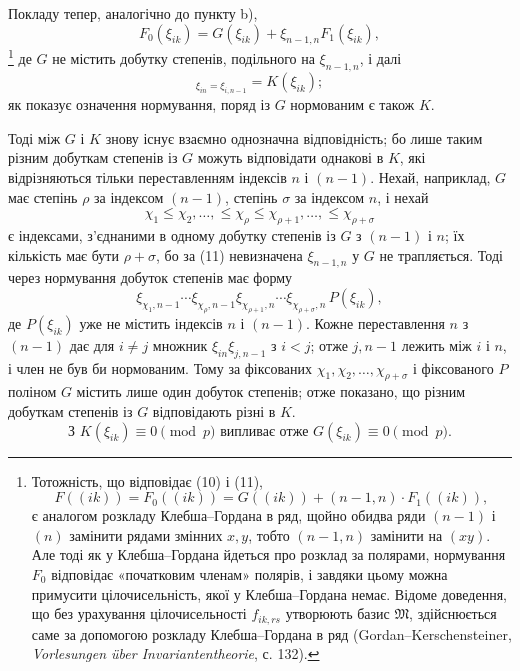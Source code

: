 \documentclass[11pt]{article}
\providecommand{\frM}{\mathfrak M}
\begin{document}
Покладу тепер, аналогічно до пункту b),
\begin{equation}
        F_0(\xi_{ik})=G(\xi_{ik})+\xi_{n-1,n}F_1(\xi_{ik}),
\end{equation}
\footnote{Тотожність, що відповідає (10) і (11),
        \[
          F((ik))=F_0((ik))=G((ik))+(n-1,n)\cdot F_1((ik)),
        \]
        є аналогом розкладу Клебша--Гордана в ряд, щойно обидва ряди \((n-1)\) і \((n)\) замінити рядами змінних \(x,y\), тобто \((n-1,n)\) замінити на \((xy)\). Але тоді як у Клебша--Гордана йдеться про розклад за полярами, нормування \(F_0\) відповідає «початковим членам» полярів, і завдяки цьому можна примусити цілочисельність, якої у Клебша--Гордана немає. Відоме доведення, що без урахування цілочисельності \(f_{ik,rs}\) утворюють базис \(\frM\), здійснюється саме за допомогою розкладу Клебша--Гордана в ряд (Gordan--Kerschensteiner, \emph{Vorlesungen über Invariantentheorie}, с. 132).}
де \(G\) не містить добутку степенів, подільного на \(\xi_{n-1,n}\), і далі
\begin{equation}
        [G]_{\xi_{in}=\xi_{i,n-1}}=K(\xi_{ik});
\end{equation}
як показує означення нормування, поряд із \(G\) нормованим є також \(K\).

Тоді між \(G\) і \(K\) знову існує взаємно однозначна відповідність; бо лише таким різним добуткам степенів із \(G\) можуть відповідати однакові в \(K\), які відрізняються тільки переставленням індексів \(n\) і \((n-1)\). Нехай, наприклад, \(G\) має степінь \(\rho\) за індексом \((n-1)\), степінь \(\sigma\) за індексом \(n\), і нехай
\[
        \chi_1\le\chi_2,\ldots,\le\chi_\rho\le\chi_{\rho+1},\ldots,\le\chi_{\rho+\sigma}
\]
є індексами, з'єднаними в одному добутку степенів із \(G\) з \((n-1)\) і \(n\); їх кількість має бути \(\rho+\sigma\), бо за (11) невизначена \(\xi_{n-1,n}\) у \(G\) не трапляється. Тоді через нормування добуток степенів має форму
\[
        \xi_{\chi_1,n-1}\cdots\xi_{\chi_\rho,n-1}
        \xi_{\chi_{\rho+1},n}\cdots\xi_{\chi_{\rho+\sigma},n}\,P(\xi_{ik}),
\]
де \(P(\xi_{ik})\) уже не містить індексів \(n\) і \((n-1)\). Кожне переставлення \(n\) з \((n-1)\) дає для \(i\ne j\) множник \(\xi_{in}\xi_{j,n-1}\) з \(i<j\); отже \(j,n-1\) лежить між \(i\) і \(n\), і член не був би нормованим. Тому за фіксованих \(\chi_1,\chi_2,\ldots,\chi_{\rho+\sigma}\) і фіксованого \(P\) поліном \(G\) містить лише один добуток степенів; отже показано, що різним добуткам степенів із \(G\) відповідають різні в \(K\).
\begin{equation}
        \text{З }K(\xi_{ik})\equiv0\pmod p\text{ випливає отже }G(\xi_{ik})\equiv0\pmod p.
\end{equation}
\end{document}
